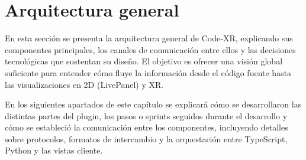 \documentclass[a4paper, 12pt]{book}
\begin{document}


\section{Arquitectura general} 
\label{sec:arquitectura}

En esta sección se presenta la arquitectura general de Code‑XR, explicando sus componentes principales, los canales de comunicación entre ellos y las decisiones tecnológicas que sustentan su diseño. El objetivo es ofrecer una visión global suficiente para entender cómo fluye la información desde el código fuente hasta las visualizaciones en 2D (LivePanel) y XR.

En los siguientes apartados de este capítulo se explicará cómo se desarrollaron las distintas partes del plugin, los pasos o sprints seguidos durante el desarrollo y cómo se estableció la comunicación entre los componentes, incluyendo detalles sobre protocolos, formatos de intercambio y la orquestación entre TypeScript, Python y las vistas cliente.
\end{document}

